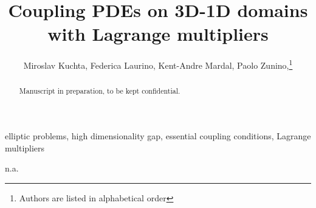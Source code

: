 \documentclass[r]{siamart171218}
\title{Coupling PDEs on 3D-1D domains with Lagrange multipliers}
\author{Miroslav Kuchta, Federica Laurino, Kent-Andre Mardal, Paolo Zunino,\thanks{Authors are listed in alphabetical order}}
\begin{document}
\linenumbers

\maketitle

\begin{abstract}
Manuscript in preparation, to be kept confidential.
\end{abstract}

\begin{keywords}
elliptic problems, high dimensionality gap, essential coupling conditions, Lagrange multipliers
\end{keywords}

\begin{AMS}
n.a.
\end{AMS}

 

\def\ud{u_{\odot}}
\def\vd{v_{\odot}}
\def\ld{\lambda_{\odot}}
\def\udh{u_{\odot h}}
\def\vdh{v_{\odot h}}
\def\ldh{\lambda_{\odot h}}
\def\md{\mu_{\odot}}
\def\lld{l_{\odot}}
\def\uf{u_{\ominus}}
\def\up{u_{\oplus}}
\def\eps{\epsilon}
\def\nn{\boldsymbol n}
\def\rr{\boldsymbol r}
\def\RR{\boldsymbol R}
\def\kk{\boldsymbol k}
\def\ss{\boldsymbol s}
\def\uu{\boldsymbol u}
\def\vv{\boldsymbol v}
\def\xx{\boldsymbol x}
\def\bu{\overline{u}}
\def\bv{\overline{v}}
\def\tu{\widetilde{u}}
\def\tv{\widetilde{v}}
\def\TT{\boldsymbol T}
\def\NN{\boldsymbol N}
\def\BB{\boldsymbol B}
\def\ttu{\widetilde{\widetilde{u}}}
\def\ttv{\widetilde{\widetilde{v}}}
\def\cv{\check{v}}
\def\mesh{{\cal T}^h}
\def\ball{{\cal B}}
\def\R{\mathbb{R}}
\def\D{\mathcal{D}}
\def\DD{\partial\mathcal{D}}
\def\trace{{\mathcal{T}_\Gamma}}
\def\mtrace{{\overline{\mathcal{T}}_\Lambda}}
\def\ext{\mathcal{E}_\Gamma}
\def\ide{\mathcal{I}}
\def\ii{\hat{\imath}}
\newcommand{\avrd}[1]{\overline{\overline{#1}}}
\newcommand{\avrc}[1]{\overline{#1}}
\newcommand{\refe}[1]{{#1}_{\mathrm{ref}}}
\newcommand{\norm}[1]{\lVert{#1}\rVert}

\newcommand{\vertiii}[1]{{\left\vert\kern-0.25ex\left\vert\kern-0.25ex\left\vert #1 
    \right\vert\kern-0.25ex\right\vert\kern-0.25ex\right\vert}}

\newtheorem{thm}{Theorem}[section]
\newtheorem{prop}{Property}[section]
\theoremstyle{remark}
\newtheorem{remark}{Remark}[section]
 
\end{document}
